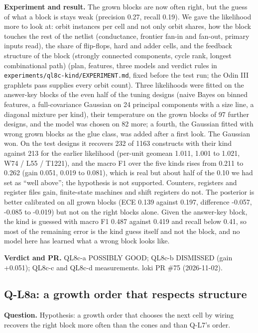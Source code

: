\documentclass[conference]{IEEEtran}
\newcommand{\hev}[1]{\par\smallskip\noindent\textbf{#1}}
\newcommand{\code}[1]{\texttt{#1}}
\begin{document}
\hev{Experiment and result.} The grown blocks are now often right, but the guess of what a block is stays weak (precision 0.27, recall 0.19). We gave the likelihood more to look at: orbit instances
per cell and not only orbit shares, how the block touches the rest of the netlist (conductance, frontier fan-in and fan-out, primary inputs read), the share of
flip-flops, hard and adder cells, and the feedback structure of the block (strongly connected components, cycle rank, longest combinational path) (plan, features, three
models and verdict rules in \code{experiments/ql8c-kind/EXPERIMENT.md}, fixed before the test run; the Odin III graphlets pass supplies every orbit count). Three likelihoods
were fitted on the answer-key blocks of the even half of the tuning designs (naive Bayes on binned features, a full-covariance Gaussian on 24 principal components with a size
line, a diagonal mixture per kind), their temperature on the grown blocks of 97 further designs, and the model was chosen on 82 more; a fourth, the Gaussian fitted with wrong
grown blocks as the glue class, was added after a first look. The Gaussian won. On the test designs it recovers 232 of 1163 constructs with their kind against 213 for the
earlier likelihood (per-unit geomean 1.011, 1.001 to 1.021, W74 / L55 / T1221), and the macro F1 over the five kinds rises from 0.211 to 0.262 (gain 0.051, 0.019 to 0.081),
which is real but about half of the 0.10 we had set as ``well above''; the hypothesis is not supported. Counters, registers and register files gain, finite-state
machines and shift registers do not. The posterior is better calibrated on all grown blocks (ECE 0.139 against 0.197, difference -0.057, -0.085 to -0.019) but not on the
right blocks alone. Given the answer-key block, the kind is guessed with macro F1 0.487 against 0.419 and recall below 0.41, so most of the remaining error is the kind
guess itself and not the block, and no model here has learned what a wrong block looks like.

\hev{Verdict and PR.} QL8c-a POSSIBLY GOOD; QL8c-b DISMISSED (gain +0.051); QL8c-c and QL8c-d measurements. loki PR \#75 (2026-11-02).

\subsection{Q-L8a: a growth order that respects structure}
\label{rec:ql8a}

\hev{Question.} Hypothesis: a growth order that chooses the next cell by wiring recovers the right block more often than the cones and than Q-L7's order.
\end{document}
